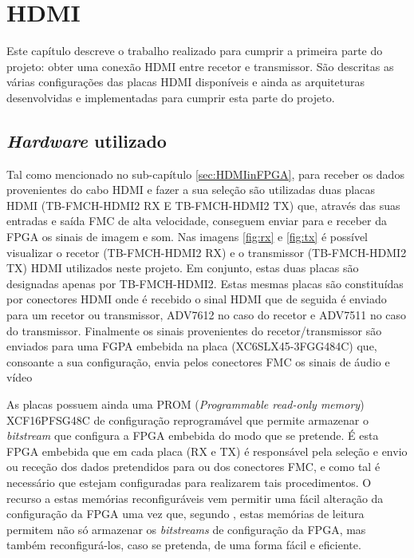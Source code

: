 \chapter{HDMI}\label{chap:chap3}

Este capítulo descreve o trabalho realizado para cumprir a primeira parte do projeto: obter uma conexão HDMI entre recetor e transmissor. São descritas as várias configurações das placas HDMI disponíveis e ainda as arquiteturas desenvolvidas e implementadas para cumprir esta parte do projeto. 

\section{\textit{Hardware} utilizado} \label{sec:hardware}

Tal como mencionado no sub-capítulo \ref{sec:HDMIinFPGA}, para receber os dados provenientes do cabo HDMI e fazer a sua seleção são utilizadas duas placas HDMI (TB-FMCH-HDMI2 RX E TB-FMCH-HDMI2 TX) que, através das suas entradas e saída FMC de alta velocidade, conseguem enviar para e receber da FPGA os sinais de imagem e som. Nas imagens \ref{fig:rx} e \ref{fig:tx} é possível visualizar o recetor (TB-FMCH-HDMI2 RX) e o transmissor (TB-FMCH-HDMI2 TX) HDMI utilizados neste projeto. Em conjunto, estas duas placas são designadas apenas por TB-FMCH-HDMI2. Estas mesmas placas são constituídas por conectores HDMI onde é recebido o sinal HDMI que de seguida é enviado para um recetor ou transmissor, ADV7612 no caso do recetor e ADV7511 no caso do transmissor. Finalmente os sinais provenientes do recetor/transmissor são enviados para uma FGPA embebida na placa (XC6SLX45-3FGG484C) que, consoante a sua configuração, envia pelos conectores FMC os sinais de áudio e vídeo

As placas possuem ainda uma PROM (\textit{Programmable read-only memory}) XCF16PFSG48C de configuração reprogramável que permite armazenar o \textit{bitstream} que configura a FPGA embebida do modo que se pretende. É esta FPGA embebida que em cada placa (RX e TX) é responsável pela seleção e envio ou receção dos dados pretendidos para ou dos conectores FMC, e como tal é necessário que estejam configuradas para realizarem tais procedimentos. O recurso a estas memórias reconfiguráveis vem permitir uma fácil alteração da configuração da FPGA uma vez que, segundo \cite{R026}, estas memórias de leitura permitem não só armazenar os \textit{bitstreams} de configuração da FPGA, mas também reconfigurá-los, caso se pretenda, de uma forma fácil e eficiente.

